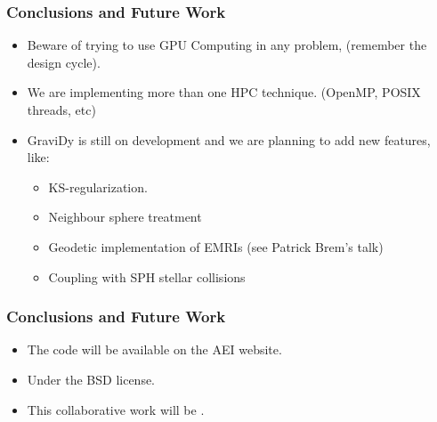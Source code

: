\begin{frame}
    \frametitle{Conclusions and Future Work}
    \begin{itemize}
        \item Beware of trying to use GPU Computing in any problem,
            (remember the  design cycle).
        \item We are implementing more than one HPC technique.
            (OpenMP, POSIX threads, etc)
        \item GraviDy is still on development and we are planning
            to add new features, like:
        \begin{itemize}
            \item KS-regularization.
            \item Neighbour sphere treatment
            \item Geodetic implementation of EMRIs (see Patrick Brem's talk)
            \item Coupling with SPH stellar collisions
        \end{itemize}
    \end{itemize}
\end{frame}

\begin{frame}
    \frametitle{Conclusions and Future Work}
    \begin{itemize}
        \item The code will be available on the AEI website.
        \item Under the BSD license.
        \item This collaborative work will be .
    \end{itemize}
\end{frame}
